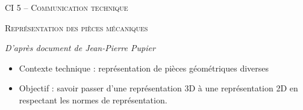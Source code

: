 \documentclass[11pt,oneside]{article}
\begin{document}
\pagestyle{fancy}
\renewcommand{\headrulewidth}{0pt}

\fancyhead{}

\fancyhead[C]{\rule{11cm}{.5pt}}


\renewcommand{\footrulewidth}{0.2pt}

\fancyfoot[C]{\footnotesize{\bfseries \thepage}}




\begin{center}
 \huge\textsc{CI 5 -- Communication technique}
\end{center}

\begin{center}
 \LARGE\textsc{Représentation des pièces mécaniques}
\end{center}

\vspace{.5cm}

\textit{D'après document de Jean-Pierre Pupier}

\begin{contexte}
\begin{itemize}
\item Contexte technique : représentation de pièces géométriques diverses
\item Objectif : savoir passer d'une représentation 3D à une représentation 2D en respectant les normes de représentation.
\end{itemize}
\end{contexte}
\end{document}

